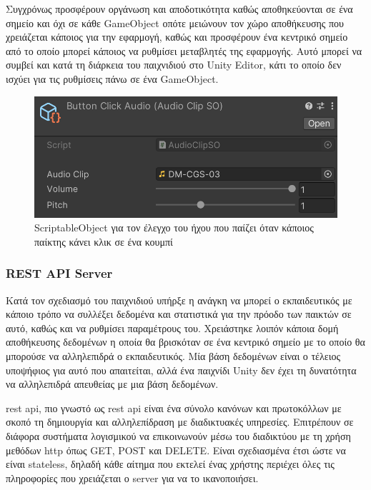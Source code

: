 Συγχρόνως προσφέρουν οργάνωση και αποδοτικότητα καθώς αποθηκεύονται σε ένα σημείο και όχι σε κάθε GameObject οπότε μειώνουν τον χώρο αποθήκευσης που χρειάζεται κάποιος για την εφαρμογή, καθώς και προσφέρουν ένα κεντρικό σημείο από το οποίο μπορεί κάποιος να ρυθμίσει μεταβλητές της εφαρμογής. Αυτό μπορεί να συμβεί και κατά τη διάρκεια του παιχνιδιού στο Unity Editor, κάτι το οποίο δεν ισχύει για τις ρυθμίσεις πάνω σε ένα GameObject.

\begin{figure}[H]
    \centering
    \includegraphics[width=0.6\linewidth]{sections/4/1/images/unity_editor_button_click_audio_so}
    \caption{ScriptableObject για τον έλεγχο του ήχου που παίζει όταν κάποιος παίκτης κάνει κλικ σε ένα κουμπί}
    \label{fig:unity_editor_button_click_audio_so}
\end{figure}


\subsubsection{REST API Server}

Κατά τον σχεδιασμό του παιχνιδιού υπήρξε η ανάγκη να μπορεί ο εκπαιδευτικός με κάποιο τρόπο να συλλέξει δεδομένα και στατιστικά για την πρόοδο των παικτών σε αυτό, καθώς και να ρυθμίσει παραμέτρους του. Χρειάστηκε λοιπόν κάποια δομή αποθήκευσης δεδομένων η οποία θα βρισκόταν σε ένα κεντρικό σημείο με το οποίο θα μπορούσε να αλληλεπιδρά ο εκπαιδευτικός. Μία βάση δεδομένων είναι ο τέλειος υποψήφιος για αυτό που απαιτείται, αλλά ένα παιχνίδι Unity δεν έχει τη δυνατότητα να αλληλεπιδρά απευθείας με μια βάση δεδομένων.

\acrlong{rest} \acrlong{api}, πιο γνωστό ως \acrshort{rest} \acrshort{api}\cite{noauthor_what_nodate-1} είναι ένα σύνολο κανόνων και πρωτοκόλλων με σκοπό τη δημιουργία και αλληλεπίδραση με διαδικτυακές υπηρεσίες. Επιτρέπουν σε διάφορα συστήματα λογισμικού να επικοινωνούν μέσω του διαδικτύου με τη χρήση μεθόδων \acrshort{http} όπως GET, POST και DELETE\cite{noauthor_http_2023}. Είναι σχεδιασμένα έτσι ώστε να είναι \gls{stateless}, δηλαδή κάθε αίτημα που εκτελεί ένας χρήστης περιέχει όλες τις πληροφορίες που χρειάζεται ο \gls{server} για να το ικανοποιήσει.

